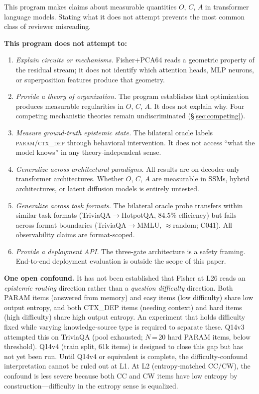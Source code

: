 \documentclass[11pt]{article}
\begin{document}
This program makes claims about measurable quantities $O$, $C$, $A$ in transformer
language models. Stating what it does not attempt prevents the most common class of
reviewer misreading.

\textbf{This program does not attempt to:}
\begin{enumerate}
  \item \emph{Explain circuits or mechanisms.} Fisher+PCA64 reads a geometric property
    of the residual stream; it does not identify which attention heads, MLP neurons, or
    superposition features produce that geometry.
  \item \emph{Provide a theory of organization.} The program establishes that optimization
    produces measurable regularities in $O$, $C$, $A$. It does not explain why. Four
    competing mechanistic theories remain undiscriminated (\S\ref{sec:competing}).
  \item \emph{Measure ground-truth epistemic state.} The bilateral oracle labels
    \textsc{param}/\textsc{ctx\_dep} through behavioral intervention. It does not access
    ``what the model knows'' in any theory-independent sense.
  \item \emph{Generalize across architectural paradigms.} All results are on decoder-only
    transformer architectures. Whether $O$, $C$, $A$ are measurable in SSMs, hybrid
    architectures, or latent diffusion models is entirely untested.
  \item \emph{Generalize across task formats.} The bilateral oracle probe transfers within
    similar task formats (TriviaQA$\to$HotpotQA, 84.5\% efficiency) but fails across
    format boundaries (TriviaQA$\to$MMLU, $\approx$random; C041). All observability
    claims are format-scoped.
  \item \emph{Provide a deployment API.} The three-gate architecture is a safety framing.
    End-to-end deployment evaluation is outside the scope of this paper.
\end{enumerate}

\textbf{One open confound.} It has not been established that Fisher at L26 reads an
\emph{epistemic routing} direction rather than a \emph{question difficulty} direction.
Both PARAM items (answered from memory) and easy items (low difficulty) share low output
entropy, and both CTX\_DEP items (needing context) and hard items (high difficulty) share
high output entropy. An experiment that holds difficulty fixed while varying
knowledge-source type is required to separate these. Q14v3 attempted this on TriviaQA
(pool exhausted; $N$\,=\,20 hard PARAM items, below threshold). Q14v4 (train split,
61k items) is designed to close this gap but has not yet been run. Until Q14v4 or
equivalent is complete, the difficulty-confound interpretation cannot be ruled out at L1.
At L2 (entropy-matched CC/CW), the confound is less severe because both CC and CW items
have low entropy by construction---difficulty in the entropy sense is equalized.
\end{document}
